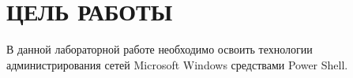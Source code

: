 \section{ЦЕЛЬ РАБОТЫ}

В данной лабораторной работе необходимо освоить технологии
администрирования сетей Microsoft Windows средствами Power Shell.

\newpage
